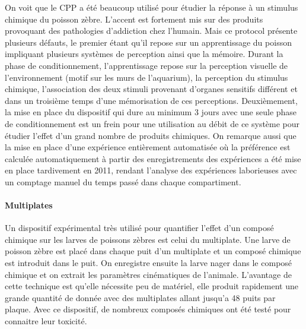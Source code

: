   \medbreak
  On voit que le CPP a été beaucoup utilisé pour étudier la réponse à un stimulus chimique du poisson zèbre. L'accent est fortement mis sur des produits provoquant des pathologies d'addiction chez l'humain. Mais ce protocol présente plusieurs défauts, le premier étant qu'il repose sur un apprentissage du poisson impliquant plusieurs systèmes de perception ainsi que la mémoire. Durant la phase de conditionnement, l'apprentissage repose sur la perception visuelle de l'environnement (motif sur les murs de l'aquarium), la perception du stimulus chimique, l'association des deux stimuli provenant d'organes sensitifs différent et dans un troisième temps d'une mémorisation de ces perceptions. Deuxièmement, la mise en place du dispositif qui dure au minimum 3 jours avec une seule phase de conditionnement est un frein pour une utilisation au débit de ce système pour étudier l'effet d'un grand nombre de produits chimiques. On remarque aussi que la mise en place d'une expérience entièrement automatisée où la préférence est calculée automatiquement à partir des enregistrements des expériences a été mise en place tardivement en 2011, rendant l'analyse des expériences laborieuses avec un comptage manuel du temps passé dans chaque compartiment.
  \paragraph{Multiplates}
  Un dispositif expérimental très utilisé pour quantifier l'effet d'un composé chimique sur les larves de poissons zèbres est celui du multiplate. Une larve de poisson zèbre est placé dans chaque puit d'un multiplate et un composé chimique est introduit dans le puit. On enregistre ensuite la larve nager dans le composé chimique et on extrait les paramètres cinématiques de l'animale. L'avantage de cette technique est qu'elle nécessite peu de matériel, elle produit rapidement une grande quantité de donnée avec des multiplates allant jusqu'a 48 puits par plaque. Avec ce dispositif, de nombreux composés chimiques ont été testé pour connaitre leur toxicité.
